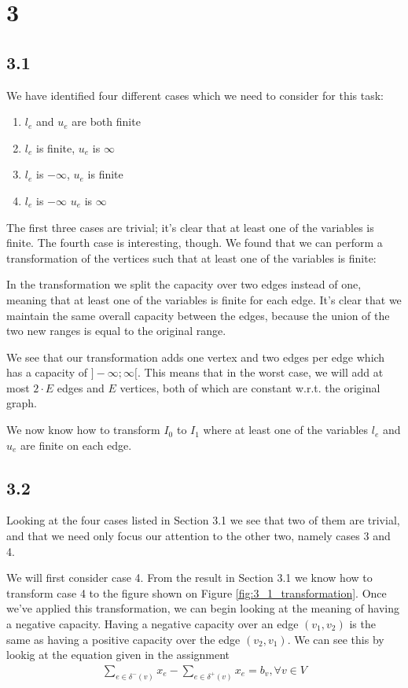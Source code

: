 \documentclass[12pt]{article}
\begin{document}
\section{3}
\subsection{3.1}
We have identified four different cases which we need to consider for this task:
\begin{enumerate}
    \item $l_e$ and $u_e$ are both finite
    \item $l_e$ is finite, $u_e$ is $\infty$
    \item $l_e$ is $-\infty$, $u_e$ is finite
    \item $l_e$ is $-\infty$ $u_e$ is $\infty$
\end{enumerate}

The first three cases are trivial; it's clear that at least one of the variables is finite. The fourth case is interesting, though. We found that we can perform a transformation of the vertices such that at least one of the variables is finite:

\label{fig:3_1_transformation}

In the transformation we split the capacity over two edges instead of one, meaning that at least one of the variables is finite for each edge. It's clear that we maintain the same overall capacity between the edges, because the union of the two new ranges is equal to the original range.

We see that our transformation adds one vertex and two edges per edge which has a capacity of $]-\infty;\infty[$. This means that in the worst case, we will add at most $2\cdot E$ edges and $E$ vertices, both of which are constant w.r.t. the original graph.

We now know how to transform $I_0$ to $I_1$ where at least one of the variables $l_e$ and $u_e$ are finite on each edge.

\subsection{3.2}
Looking at the four cases listed in Section 3.1 we see that two of them are trivial, and that we need only focus our attention to the other two, namely cases 3 and 4.

We will first consider case 4. From the result in Section 3.1 we know how to transform case 4 to the figure shown on Figure \ref{fig:3_1_transformation}. Once we've applied this transformation, we can begin looking at the meaning of having a negative capacity. Having a negative capacity over an edge $(v_1, v_2)$ is the same as having a positive capacity over the edge $(v_2, v_1)$. We can see this by lookig at the equation given in the assignment
\begin{align*}
    \sum_{e\in \delta^-(v)}{x_e}-\sum_{e\in \delta^+(v)}{x_e} = b_v, \forall{v} \in V
\end{align*}
\end{document}
